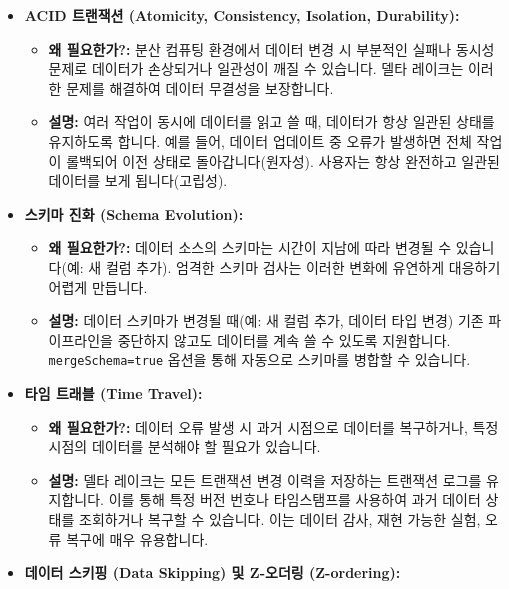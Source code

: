 \documentclass[11pt,a4paper]{article}
\begin{document}
\begin{tcolorbox}[title=\textbf{델타 레이크의 주요 기능}, colback=cyan!5!white, colframe=cyan!75!black, sharp corners, boxrule=0.8pt]
\begin{itemize}
    \item \textbf{ACID 트랜잭션 (Atomicity, Consistency, Isolation, Durability):}
    \begin{itemize}
        \item \textbf{왜 필요한가?:} 분산 컴퓨팅 환경에서 데이터 변경 시 부분적인 실패나 동시성 문제로 데이터가 손상되거나 일관성이 깨질 수 있습니다. 델타 레이크는 이러한 문제를 해결하여 데이터 무결성을 보장합니다.
        \item \textbf{설명:} 여러 작업이 동시에 데이터를 읽고 쓸 때, 데이터가 항상 일관된 상태를 유지하도록 합니다. 예를 들어, 데이터 업데이트 중 오류가 발생하면 전체 작업이 롤백되어 이전 상태로 돌아갑니다(원자성). 사용자는 항상 완전하고 일관된 데이터를 보게 됩니다(고립성).
    \end{itemize}
    \item \textbf{스키마 진화 (Schema Evolution):}
    \begin{itemize}
        \item \textbf{왜 필요한가?:} 데이터 소스의 스키마는 시간이 지남에 따라 변경될 수 있습니다(예: 새 컬럼 추가). 엄격한 스키마 검사는 이러한 변화에 유연하게 대응하기 어렵게 만듭니다.
        \item \textbf{설명:} 데이터 스키마가 변경될 때(예: 새 컬럼 추가, 데이터 타입 변경) 기존 파이프라인을 중단하지 않고도 데이터를 계속 쓸 수 있도록 지원합니다. \texttt{mergeSchema=true} 옵션을 통해 자동으로 스키마를 병합할 수 있습니다.
    \end{itemize}
    \item \textbf{타임 트래블 (Time Travel):}
    \begin{itemize}
        \item \textbf{왜 필요한가?:} 데이터 오류 발생 시 과거 시점으로 데이터를 복구하거나, 특정 시점의 데이터를 분석해야 할 필요가 있습니다.
        \item \textbf{설명:} 델타 레이크는 모든 트랜잭션 변경 이력을 저장하는 트랜잭션 로그를 유지합니다. 이를 통해 특정 버전 번호나 타임스탬프를 사용하여 과거 데이터 상태를 조회하거나 복구할 수 있습니다. 이는 데이터 감사, 재현 가능한 실험, 오류 복구에 매우 유용합니다.
    \end{itemize}
    \item \textbf{데이터 스키핑 (Data Skipping) 및 Z-오더링 (Z-ordering):}
    \begin{itemize}

\end{itemize}
\end{itemize}
\end{tcolorbox}
\end{document}
